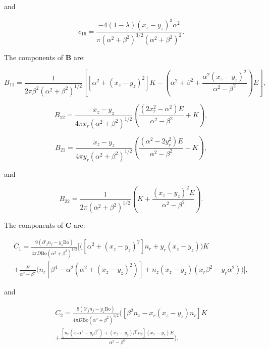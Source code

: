 \documentclass[12pt]{article}
\begin{document}
and 

\begin{equation}
\label{equ:coeff_a16}
c_{16} = \frac{-4 (1 - \lambda) (x_{z} - y_{z})^{3} \alpha^{2}}{\pi (\alpha^{2} + \beta^{2})^{3/2} (\alpha^{2} + \beta^{2})^{2}}.
\end{equation}

The components of $\boldsymbol{B}$ are:

\begin{equation}
\label{equ:B11_comp}
B_{11} = \frac{1}{2 \pi \beta^{2} (\alpha^{2} + \beta^{2})^{1/2}} \left[ [\alpha^{2} + (x_{z} - y_{z})^{2}] K - \left( \alpha^{2} + \beta^{2} + \frac{\alpha^{2} (x_{z} - y_{z})^{2}}{\alpha^{2} - \beta^{2}}\right) E\right],
\end{equation}


\begin{equation}
\label{equ:B12_comp}
B_{12} = \frac{x_{z} - y_{z}}{4 \pi x_{r} (\alpha^{2} + \beta^{2})^{1/2}} \left( \frac{(2 x_{r}^{2} - \alpha^{2}) E}{\alpha^{2} - \beta^{2}} + K \right),
\end{equation}

\begin{equation}
\label{equ:B21_comp}
B_{21} = \frac{x_{z} - y_{z}}{4 \pi y_{r} (\alpha^{2} + \beta^{2})^{1/2}} \left( \frac{(\alpha^{2} - 2 y_{r}^{2}) E}{\alpha^{2} - \beta^{2}} - K\right),
\end{equation}

and 

\begin{equation}
\label{equ:B22_comp}
B_{22} = \frac{1}{2 \pi (\alpha^{2} + \beta^{2})^{1/2}} \left(K + \frac{(x_{z} - y_{z})^{2} E}{\alpha^{2} - \beta^{2}}\right).
\end{equation}

The components of $\boldsymbol{C}$ are:

\begin{align}
\label{equ:C1_comp}
C_{1} = \frac{9 (\partial'_{j} n_{j} - y_{z} \text{Bo})}{4 \pi D \text{Bo} (\alpha^{2} + \beta^{2})^{1/2}} \bigg[ \bigg( [\alpha^{2} + (x_{z} - y_{z})^{2}] n_{r} + y_{r} (x_{z} - y_{z}) \bigg) K \nonumber \\
+ \frac{E}{\alpha^{2} - \beta^{2}} \bigg( n_{r} [\beta^{4} - \alpha^{2} (\alpha^{2} + (x_{z} - y_{z})^{2})] + n_{z} (x_{z} - y_{z}) (x_{r} \beta^{2} - y_{r} \alpha^{2}) \bigg) \bigg],
\end{align}

and 

\begin{align}
\label{equ:C2_comp}
C_{2} = \frac{9 (\partial'_{j} n_{j} - y_{z} \text{Bo})}{4 \pi D \text{Bo} (\alpha^{2} + \beta^{2})^{1/2}}  \bigg( [\beta^{2} n_{z} - x_{r} (x_{z} - y_{z}) n_{r}] K \nonumber \\
+ \frac{[n_{r} (x_{r} \alpha^{2} - y_{r} \beta^{2}) + (x_{z} - y_{z}) \beta^{2} n_{z}] (x_{z} - y_{z}) E}{\alpha^{2} - \beta^{2}}\bigg).
\end{align}
\end{document}
